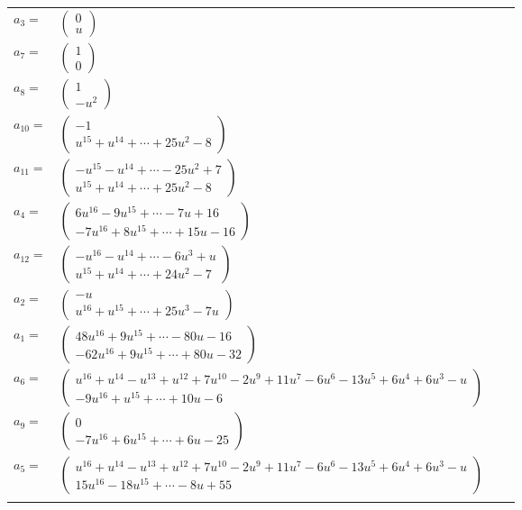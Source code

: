 \documentclass[1p]{elsarticle_modified}
\theoremstyle{definition}
\begin{document}
\begin{tabular}{m{7pt} m{180pt} m{7pt} m{180pt} }
\flushright $a_{3}=$&$\begin{pmatrix}0\\u\end{pmatrix}$ \\
\flushright $a_{7}=$&$\begin{pmatrix}1\\0\end{pmatrix}$ \\
\flushright $a_{8}=$&$\begin{pmatrix}1\\- u^2\end{pmatrix}$ \\
\flushright $a_{10}=$&$\begin{pmatrix}-1\\u^{15}+u^{14}+\cdots+25 u^2-8\end{pmatrix}$ \\
\flushright $a_{11}=$&$\begin{pmatrix}- u^{15}- u^{14}+\cdots-25 u^2+7\\u^{15}+u^{14}+\cdots+25 u^2-8\end{pmatrix}$ \\
\flushright $a_{4}=$&$\begin{pmatrix}6 u^{16}-9 u^{15}+\cdots-7 u+16\\-7 u^{16}+8 u^{15}+\cdots+15 u-16\end{pmatrix}$ \\
\flushright $a_{12}=$&$\begin{pmatrix}- u^{16}- u^{14}+\cdots-6 u^3+u\\u^{15}+u^{14}+\cdots+24 u^2-7\end{pmatrix}$ \\
\flushright $a_{2}=$&$\begin{pmatrix}- u\\u^{16}+u^{15}+\cdots+25 u^3-7 u\end{pmatrix}$ \\
\flushright $a_{1}=$&$\begin{pmatrix}48 u^{16}+9 u^{15}+\cdots-80 u-16\\-62 u^{16}+9 u^{15}+\cdots+80 u-32\end{pmatrix}$ \\
\flushright $a_{6}=$&$\begin{pmatrix}u^{16}+u^{14}- u^{13}+u^{12}+7 u^{10}-2 u^9+11 u^7-6 u^6-13 u^5+6 u^4+6 u^3- u\\-9 u^{16}+u^{15}+\cdots+10 u-6\end{pmatrix}$ \\
\flushright $a_{9}=$&$\begin{pmatrix}0\\-7 u^{16}+6 u^{15}+\cdots+6 u-25\end{pmatrix}$ \\
\flushright $a_{5}=$&$\begin{pmatrix}u^{16}+u^{14}- u^{13}+u^{12}+7 u^{10}-2 u^9+11 u^7-6 u^6-13 u^5+6 u^4+6 u^3- u\\15 u^{16}-18 u^{15}+\cdots-8 u+55\end{pmatrix}$\\&\end{tabular}
\end{document}
